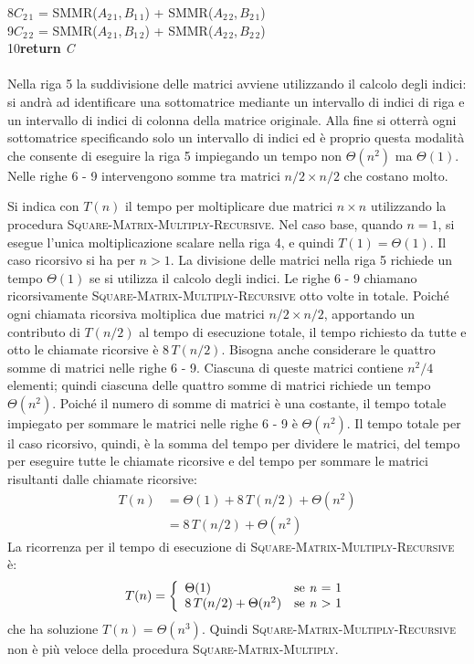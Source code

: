 \documentclass[10pt, a4paper]{report}
\newcommand\firsttab[1][0.5cm]{\hspace*{#1}}
\newcommand\secondtab[1][1cm]{\hspace*{#1}}
\begin{document}
8\secondtab\textit{$C_{2\,1}$} = \textsc{SMMR(\textit{$A_{2\,1}$},\,\textit{$B_{1\,1}$})} + \textsc{SMMR(\textit{$A_{2\,2}$},\,\textit{$B_{2\,1}$})} \\
9\secondtab\textit{$C_{2\,2}$} = \textsc{SMMR(\textit{$A_{2\,1}$},\,\textit{$B_{1\,2}$})} + \textsc{SMMR(\textit{$A_{2\,2}$},\,\textit{$B_{2\,2}$})} \\
10\firsttab\textbf{return} \textit{C}\\\\
Nella riga 5 la suddivisione delle matrici avviene utilizzando il calcolo degli indici: si andrà ad identificare una sottomatrice mediante un intervallo di indici di riga e un intervallo di indici di colonna della matrice originale. Alla fine si otterrà ogni sottomatrice specificando solo un intervallo di indici ed è proprio questa modalità che consente di eseguire la riga 5 impiegando un tempo non $\Theta(n^2)$ ma $\Theta(1)$. Nelle righe 6 - 9 intervengono somme tra matrici $n/2 \times n/2$ che costano molto.

Si indica con $T(n)$ il tempo per moltiplicare due matrici $n \times n$ utilizzando la procedura \textsc{Square-Matrix-Multiply-Recursive}. Nel caso base, quando $n = 1$, si esegue l'unica moltiplicazione scalare nella riga 4, e quindi $T(1) = \Theta(1)$. Il caso ricorsivo si ha per $n > 1$. La divisione delle matrici nella riga 5 richiede un tempo $\Theta(1)$ se si utilizza il calcolo degli indici. Le righe 6 - 9 chiamano ricorsivamente  \textsc{Square-Matrix-Multiply-Recursive} otto volte in totale. Poiché ogni chiamata ricorsiva moltiplica due matrici $n/2 \times n/2$, apportando un contributo di $T(n/2)$ al tempo di esecuzione totale, il tempo richiesto da tutte e otto le chiamate ricorsive è $8\,T(n/2)$. Bisogna anche considerare le quattro somme di matrici nelle righe 6 - 9. Ciascuna di queste matrici contiene $n^2/4$ elementi; quindi ciascuna delle quattro somme di matrici richiede un tempo $\Theta(n^2)$. Poiché il numero di somme di matrici è una costante, il tempo totale impiegato per sommare le matrici nelle righe 6 - 9 è $\Theta(n^2)$. Il tempo totale per il caso ricorsivo, quindi, è la somma del tempo per dividere le matrici, del tempo per eseguire tutte le chiamate ricorsive e del tempo per sommare le matrici risultanti dalle chiamate ricorsive:
\begin{align*}
T(n) &= \Theta(1) + 8\,T(n/2) + \Theta(n^2) \\
&= 8\,T(n/2) + \Theta(n^2)
\end{align*}
La ricorrenza per il tempo di esecuzione di \textsc{Square-Matrix-Multiply-Recursive} è:
\begin{equation*}
T(n) = \left\{
\begin{array}{ll}
\Theta(1) & \text{se \textit{n} = 1} \\
8\,T(n/2) + \Theta(n^2) & \text{se \textit{n} $>$ 1}
\end{array}\right.
\end{equation*}
che ha soluzione $T(n) = \Theta(n^3)$. Quindi \textsc{Square-Matrix-Multiply-Recursive} non è più veloce della procedura \textsc{Square-Matrix-Multiply}.
\end{document}
